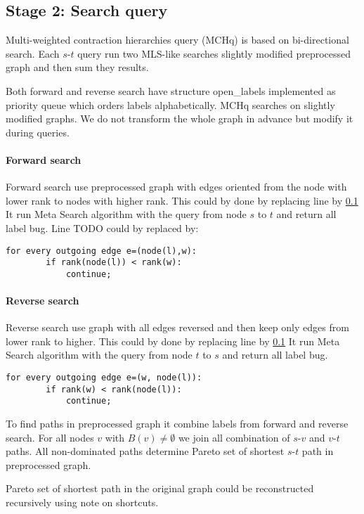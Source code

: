 
\subsection{Stage 2: Search query}

Multi-weighted contraction hierarchies query (MCHq) 
is based on bi-directional search.
Each $s$-$t$ query run two MLS-like searches slightly modified preprocessed graph
and then sum they results.

Both forward and reverse search have
structure open\_labels implemented as priority queue which orders labels
alphabetically.
MCHq searches on slightly modified graphs. 
We do not transform the whole graph in advance but modify it during queries.

\paragraph*{Forward search}
Forward search use preprocessed graph with edges oriented from the node with lower rank to nodes with higher rank.
This could by done by replacing line  by \ref{}
It run Meta Search algorithm with the query from node $s$ to $t$ and return all label bug.
Line TODO could by replaced by:

\begin{lstlisting}[caption={MCHp},label=list:8-6,captionpos=t,float,abovecaptionskip=-\medskipamount]
    for every outgoing edge e=(node(l),w):
    	if rank(node(l)) < rank(w):
        	continue;
\end{lstlisting}

\paragraph*{Reverse search}
Reverse search use graph with all edges reversed and then keep only edges
from lower rank to higher. 
This could by done by replacing line  by \ref{}
It run Meta Search algorithm with the query from node $t$ to $s$ and return all label bug.

\begin{lstlisting}[caption={MCHp},label=list:8-6,captionpos=t,float,abovecaptionskip=-\medskipamount]
    for every outgoing edge e=(w, node(l)):
    	if rank(w) < rank(node(l)):
        	continue;
\end{lstlisting}

To find paths in preprocessed graph it combine labels from forward and reverse search. 
For all nodes $v$ with $B(v) \ne \emptyset$ we join all combination of $s$-$v$ and $v$-$t$ paths. 
All non-dominated paths determine Pareto set of shortest $s$-$t$ path in preprocessed graph.

Pareto set of shortest path in the original graph could be reconstructed recursively
using note on shortcuts.


